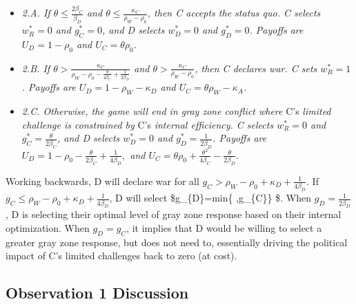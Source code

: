 \documentclass[
]{article}
\begin{document}
\begin{itemize}
\item \textit{2.A. If $\theta\leq\frac{2\beta_{C}}{\beta_{D}}$ and $\theta\leq\frac{\kappa_{C}}{\rho_{W}-\rho_{0}}$, then C accepts the status quo. C selects $w_{R}^{*}=0$ and $g_{C}^{*}=0$, and D selects $w_{D}^{*}=0$ and $g_{D}^{*}=0$. Payoffs are $U_{D}=1-\rho_{0}$ and $U_{C}=\theta\rho_{0}.$} 
\item \textit{2.B. If $\theta>\frac{\kappa_{C}}{\rho_{W}-\rho_{0}-\frac{\theta}{4\beta_{C}}+\frac{1}{2\beta_{D}}}$ and $\theta>\frac{\kappa_{C}}{\rho_{W}-\rho_{0}}$, then C declares war. C sets $w_{R}^{*}=1$. Payoffs are $U_{D}=1-\rho_{W}-\kappa_{D}$ and $U_{C}=\theta\rho_{W}-\kappa_{A}$.} 
\item \textit{2.C. Otherwise, the game will end in gray zone conflict where }C's\textit{ limited challenge is constrained by }C's\textit{ internal efficiency. C selects $w_{R}^{*}=0$ and $g_{C}^{*}=\frac{\theta}{2\beta_{C}}$, and D selects $w_{D}^{*}=0$ and $g_{D}^{*}=\frac{1}{2\beta_{D}}$. Payoffs are $U_{D}=1-\rho_{0}-\frac{\theta}{2\beta_{C}}+\frac{1}{4\beta_{D}},$ and $U_{C}=\theta\rho_{0}+\frac{\theta^{2}}{4\beta_{C}}-\frac{\theta}{2\beta_{D}}.$} 
\end{itemize}

Working backwards, D will declare war for all
\(g_{C}>\rho_{W}-\rho_{0}+\kappa_{D}+\frac{1}{4\beta_{D}}\). If
\(g_{C}\leq\rho_{W}-\rho_{0}+\kappa_{D}+\frac{1}{4\beta_{D}}\), D will
select \$g\_\{D\}=min\left\{ ,g\_\{C\}\right\} \$.
When \(g_{D}=\frac{1}{2\beta_{D}}\), D is selecting their optimal level
of gray zone response based on their internal optimization. When
\(g_{D}=g_{C}\), it implies that D would be willing to select a greater
gray zone response, but does not need to, essentially driving the
political impact of C's limited challenges back to zero (at cost).

\hypertarget{observation-1-discussion}{%
\subsection{Observation 1 Discussion}\label{observation-1-discussion}}
\end{document}
